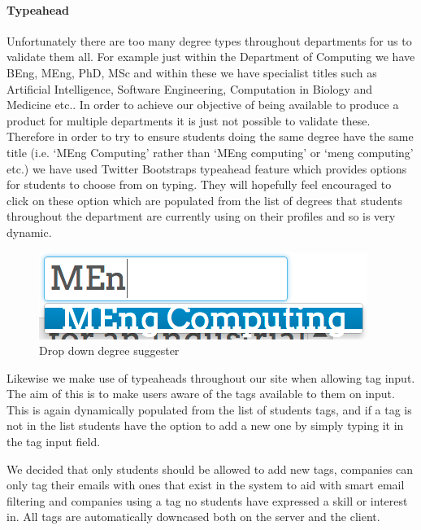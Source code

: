     \paragraph{Typeahead} Unfortunately there are too many degree types throughout departments for us to validate them all. For example just within the Department of Computing we have BEng, MEng, PhD, MSc and within these we have specialist titles such as Artificial Intelligence, Software Engineering, Computation in Biology and Medicine etc.\cite{doc-ug-degrees}. In order to achieve our objective of being available to produce a product for multiple departments it is just not possible to validate these. Therefore in order to try to ensure students doing the same degree have the same title (i.e. `MEng Computing' rather than `MEng computing' or `meng computing' etc.) we have used Twitter Bootstraps typeahead feature which provides options for students to choose from on typing. They will hopefully feel encouraged to click on these option which are populated from the list of degrees that students throughout the department are currently using on their profiles and so is very dynamic.

    \begin{figure}[H]\centering
    \includegraphics[scale=0.5]{images/design/edit_suggestions}
    \caption{Drop down degree suggester}
    \end{figure}

    Likewise we make use of typeaheads throughout our site when allowing tag input. The aim of this is to make users aware of the tags available to them on input. This is again dynamically populated from the list of students tags, and if a tag is not in the list students have the option to add a new one by simply typing it in the tag input field. 

    We decided that only students should be allowed to add new tags, companies can only tag their emails with ones that exist in the system to aid with smart email filtering and companies using a tag no students have expressed a skill or interest in.
    All tags are automatically downcased both on the server and the client.

